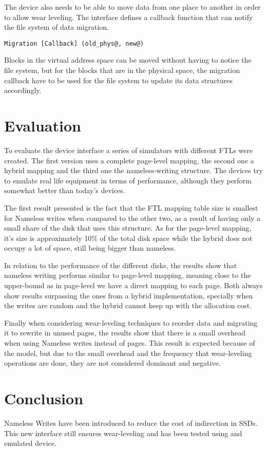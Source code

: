 \documentclass[twocolumn,a4paper,10pt]{article}
\begin{document}
The device also needs to be able to move data from one place to another in
order to allow wear leveling. The interface defines a callback function that
can notify the file system of data migration.
\begin{lstlisting}
Migration [Callback] (old_phys@, new@)
\end{lstlisting}
Blocks in the virtual address space can be moved without having to notice the
file system, but for the blocks that are in the physical space, the migration
callback have to be used for the file system to update its data structures
accordingly.

\section*{Evaluation}
To evaluate the device interface a series of simulators with different FTLs
were created. The first version uses a complete page-level mapping, the second
one a hybrid mapping and the third one the nameless-writing structure. The
devices try to emulate real life equipment in terms of performance, although
they perform somewhat better than today’s devices.

The first result presented is the fact that the FTL mapping table size is
smallest for Nameless writes when compared to the other two, as a result of
having only a small share of the disk that uses this structure. As for the
page-level mapping, it’s size is approximately 10\% of the total disk space
while the hybrid does not occupy a lot of space, still being bigger than
nameless.

In relation to the performance of the different disks, the results show that
nameless writing performs similar to page-level mapping, meaning close to the
upper-bound as in page-level we have a direct mapping to each page. Both
always show results surpassing the ones from a hybrid implementation,
specially when the writes are random and the hybrid cannot keep up with the
allocation cost.

Finally when considering wear-leveling techniques to reorder data and
migrating it to rewrite in unused pages, the results show that there is a
small overhead when using Nameless writes instead of pages. This result is
expected because of the model, but due to the small overhead and the frequency
that wear-leveling operations are done, they are not considered dominant and
negative.

\section*{Conclusion}
Nameless Writes have been introduced to reduce the cost of indirection in
SSDs. This new interface still ensures wear-leveling and has been tested using
and emulated device.
\end{document}
